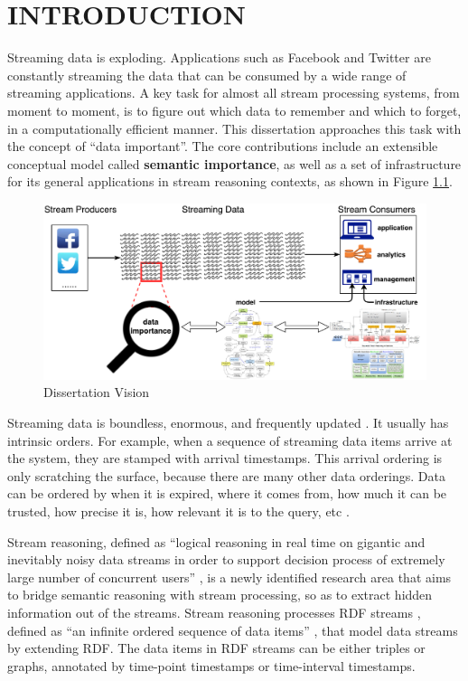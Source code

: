 \chapter{INTRODUCTION}
Streaming data is exploding. 
Applications such as Facebook and Twitter are constantly streaming the data that can be consumed by a wide range of streaming applications.
A key task for almost all stream processing systems, from moment to moment, is to figure out which data to remember and which to forget, in a computationally efficient manner. 
This dissertation approaches this task with the concept of ``data important''.
The core contributions include an extensible conceptual model called \textbf{semantic importance}, as well as a set of infrastructure for its general applications in stream reasoning contexts, as shown in Figure \ref{fig:1-tv}.

\begin{figure}[!htbp]
	\centering
    \includegraphics[width=5in]{img/1-tv.pdf}
    \caption{Dissertation Vision}
    \label{fig:1-tv}
\end{figure}

Streaming data is boundless, enormous, and frequently updated \cite{rodriguez2009semantic}.
It usually has intrinsic orders. 
For example, when a sequence of streaming data items arrive at the system, they are stamped with arrival timestamps.
This arrival ordering is only scratching the surface, because there are many other data orderings. 
Data can be ordered by when it is expired, where it comes from, how much it can be trusted, how precise it is, how relevant it is to the query, etc \cite{della2013order}. 

Stream reasoning, defined as ``logical reasoning in real time on gigantic and inevitably noisy data streams in order to support decision process of extremely large number of concurrent users'' \cite{barbieri2010stream}, is a newly identified research area that aims to bridge semantic reasoning with stream processing, so as to extract hidden information out of the streams.
Stream reasoning processes RDF streams \cite{barbieri2010querying}, defined as ``an infinite ordered sequence of data items'' \cite{srtutorial}, that model data streams by extending RDF.
The data items in RDF streams can be either triples or graphs, annotated by time-point timestamps or time-interval timestamps.

